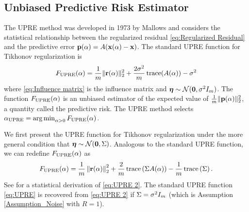 \documentclass[12pt]{article}
\begin{document}

\subsection{Unbiased Predictive Risk Estimator} \label{sec:UPRE}
The UPRE method was developed in 1973 by Mallows and considers the statistical relationship between the regularized residual \eqref{eq:Regularized Residual} and the predictive error $\mathbf{p}(\alpha) = A(\mathbf{x}(\alpha) - \mathbf{x})$. The standard UPRE function for Tikhonov regularization is
\begin{equation}
\label{eq:UPRE}
F_{\text{UPRE}}(\alpha) = \frac{1}{m}\|\mathbf{r}(\alpha)\|_2^2 + \frac{2\sigma^2}{m}\operatorname{trace}(A(\alpha)) - \sigma^2
\end{equation}
where \eqref{eq:Influence matrix} is the influence matrix and $\bm{\eta} \sim \mathcal{N}(\bm{0},\sigma^2 I_{m})$. The function $F_{\text{UPRE}}(\alpha)$ is an unbiased estimator of the expected value of $\frac{1}{m}\|\mathbf{p}(\alpha)\|_2^2$, a quantity called the predictive risk. The UPRE method selects $\alpha_{\textrm{UPRE}} = \operatorname*{arg\,min}_{\alpha > 0} F_{\text{UPRE}}(\alpha)$. \par
We first present the UPRE function for Tikhonov regularization under the more general condition that $\bm{\eta} \sim \mathcal{N}(\bm{0},\Sigma)$. Analogous to the standard UPRE function, we can redefine $F_{\text{UPRE}}(\alpha)$ as
\begin{equation}
\label{eq:UPRE 2}
F_{\text{UPRE}}(\alpha) = \frac{1}{m}\left\|\mathbf{r}(\alpha)\right\|_2^2 + \frac{2}{m}\operatorname{trace}\left(\Sigma A(\alpha)\right) - \frac{1}{m}\operatorname{trace}\left(\Sigma\right).
\end{equation}
See \cite{Byrne} for a statistical derivation of \eqref{eq:UPRE 2}. The standard UPRE function \eqref{eq:UPRE} is recovered from \eqref{eq:UPRE 2} if $\Sigma = \sigma^2 I_{m}$ (which is Assumption \ref{Assumption_Noise} with $R = 1$).
\end{document}
